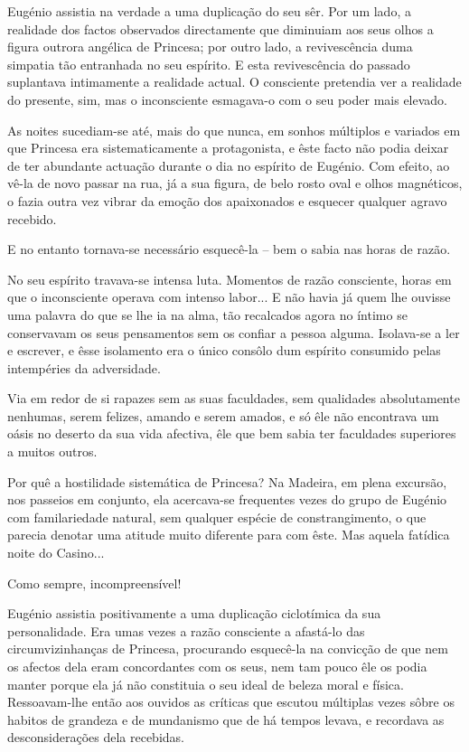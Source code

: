 \documentclass[9pt]{article}
\begin{document}
Eugé\-nio assistia na verdade a uma duplica\-ção do seu sêr. Por um lado,
a realidade dos factos observados directamente que diminuiam aos seus o\-lhos
a figura outrora angélica de Princesa; por outro lado, a revivescência duma
simpatia tão entranhada no seu espírito. E esta revivescência do passado
suplantava intimamente a realidade actual. O consciente pretendia ver a realidade do presente, sim, mas o in\-cons\-ciente esmagava-o com o seu poder mais
elevado.

As noites sucediam-se até, mais do que nunca, em sonhos múltiplos e variados em que Princesa era sistematicamente a protagonista, e  êste facto não
podia deixar de ter abundante actua\-ção durante o dia no espírito de Eugé\-nio.
Com efeito, ao vê-la de novo passar na rua, já a sua figura, de belo rosto
oval e o\-lhos magnéticos, o fazia outra vez vibrar da emo\-ção dos apaixonados
e esque\-cer qualquer agravo recebido.

E no entanto tornava-se necessário esquecê-la -- bem o sabia nas horas
de razão.

No seu espírito travava-se intensa luta. Momentos de razão cons\-ciente,
horas em que o inconsciente operava com intenso labor... E não havia já
quem lhe ouvisse uma palavra do que se lhe ia na alma, tão recalcados agora
no íntimo se conservavam os seus pensamentos sem os confiar a pessoa alguma.
Isolava-se a ler e escrever, e êsse isolamento era o único consôlo dum espírito consumido pelas intempéries da adver\-sidade.

Via em redor de si rapazes sem as suas faculdades, sem qualidades absolutamente nenhumas,  serem felizes, amando e serem amados, e só êle não encontrava um oásis no deserto da sua vida afectiva, êle que bem sabia ter faculdades superiores a muitos outros.

Por quê a hostilidade sistemática de Princesa? Na Madeira, em plena excursão, nos passeios em conjunto, ela acercava-se frequentes vezes do grupo
de Eugé\-nio com familariedade natural, sem qualquer espécie de constrangimento, o que parecia denotar uma atitude muito diferente para com êste. Mas
aquela fatídica noite do Casino...

Como sempre, incompreensível!

Eugé\-nio assistia positivamente a uma duplica\-ção ciclotímica da sua
personalidade. Era umas vezes a razão consciente a afastá-lo das circumvizinhan\-ças de Princesa, procurando esquecê-la na convic\-ção de que nem os afectos dela eram concordantes com os seus, nem tam pouco êle os podia manter
porque ela já não constituia o seu ideal de beleza moral e física. Ressoavam-lhe então aos ouvidos as críticas que escutou múltiplas vezes sôbre os habitos de gran\-deza e de mundanismo que de há tempos levava, e recordava as
desconsidera\-ções dela recebidas.
\end{document}
